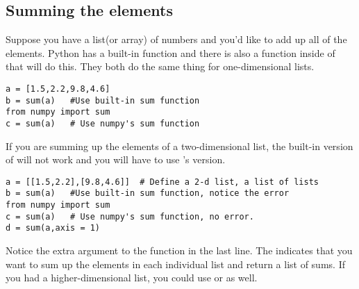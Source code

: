 \subsection*{Summing the elements}
Suppose you have a list(or array) of numbers and you'd like to add up
all of the elements.  Python has a built-in  function and
there is also a  function inside of  that
will do this. They both do the same thing for one-dimensional lists.
\begin{Verbatim}
a = [1.5,2.2,9.8,4.6]
b = sum(a)   #Use built-in sum function
from numpy import sum
c = sum(a)   # Use numpy's sum function
\end{Verbatim}
If you are summing up the elements of a two-dimensional list, the
built-in version of  will not work and you will have to
use 's version.
\begin{Verbatim}
a = [[1.5,2.2],[9.8,4.6]]  # Define a 2-d list, a list of lists
b = sum(a)   #Use built-in sum function, notice the error
from numpy import sum
c = sum(a)   # Use numpy's sum function, no error.
d = sum(a,axis = 1)
\end{Verbatim}
Notice the extra argument to the  function in the last
line.  The  indicates that you want to sum up the
elements in each individual list and return a list of sums.  If you
had a higher-dimensional list, you could use  or
 as well.


